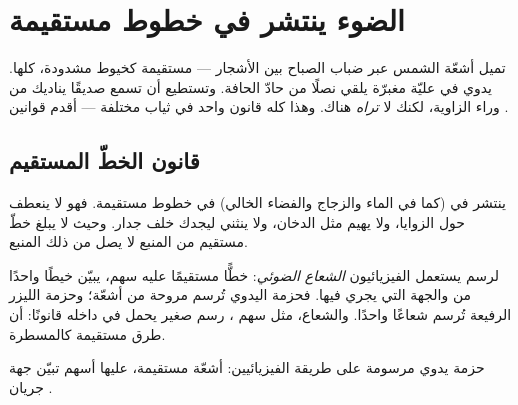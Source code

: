 \chapter{الضوء ينتشر في خطوط مستقيمة}\label{ch:g4:light-straight-lines}

تميل أشعّة الشمس عبر ضباب الصباح بين الأشجار --- مستقيمة كخيوط
مشدودة، كلها.  يدوي في عليّة مغبرّة يلقي نصلًا من  حادّ
الحافة. وتستطيع أن تسمع صديقًا يناديك من وراء الزاوية، لكنك لا
\emph{تراه} هناك. وهذا كله قانون واحد في ثياب مختلفة --- أقدم
قوانين .

\section{قانون الخطّ المستقيم}

\begin{proposition}\label{prop:g4:light-straight-lines:law}
ينتشر  في  (كما في الماء والزجاج والفضاء الخالي) في
خطوط مستقيمة. فهو لا ينعطف حول الزوايا، ولا يهيم مثل الدخان،
ولا ينثني ليجدك خلف جدار. وحيث لا يبلغ خطّ مستقيم من المنبع لا
يصل  من ذلك المنبع.
\end{proposition}

\begin{definition}\label{def:g4:light-straight-lines:ray}
لرسم  يستعمل الفيزيائيون \emph{الشعاع
الضوئي}: خطًّا مستقيمًا عليه سهم، يبيّن خيطًا
واحدًا من  والجهة التي يجري فيها. فحزمة  اليدوي
تُرسم مروحة من أشعّة؛ وحزمة الليزر الرفيعة تُرسم شعاعًا واحدًا.
والشعاع، مثل سهم ، رسم صغير يحمل في داخله قانونًا: أن طرق
 مستقيمة كالمسطرة.
\end{definition}

\begin{omfigure}

{\small حزمة  يدوي مرسومة على طريقة الفيزيائيين: أشعّة
مستقيمة، عليها أسهم تبيّن جهة جريان .}
\end{omfigure}

